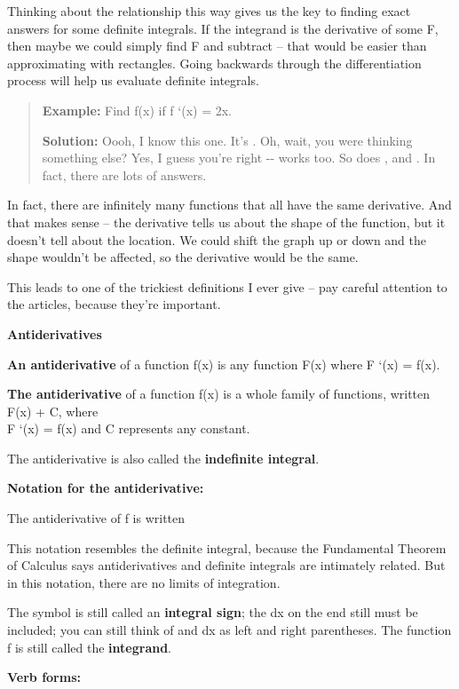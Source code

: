 Thinking about the relationship this way gives us the key to finding
exact answers for some definite integrals. If the integrand is the
derivative of some F, then maybe we could simply find F and subtract --
that would be easier than approximating with rectangles. Going backwards
through the differentiation process will help us evaluate definite
integrals.

\begin{quote}
\textbf{Example:} Find f(x) if f `(x) = 2x.

\textbf{Solution:} Oooh, I know this one. It's . Oh, wait, you were
thinking something else? Yes, I guess you're right -\/- works too. So
does , and . In fact, there are lots of answers.
\end{quote}

In fact, there are infinitely many functions that all have the same
derivative. And that makes sense -- the derivative tells us about the
shape of the function, but it doesn't tell about the location. We could
shift the graph up or down and the shape wouldn't be affected, so the
derivative would be the same.

This leads to one of the trickiest definitions I ever give -- pay
careful attention to the articles, because they're important.

\textbf{Antiderivatives}

\textbf{An antiderivative} of a function f(x) is any function F(x) where
F `(x) = f(x).

\textbf{The antiderivative} of a function f(x) is a whole family of
functions, written F(x) + C, where\\
F `(x) = f(x) and C represents any constant.

The antiderivative is also called the \textbf{indefinite integral}.

\textbf{Notation for the antiderivative: }

The antiderivative of f is written

This notation resembles the definite integral, because the Fundamental
Theorem of Calculus says antiderivatives and definite integrals are
intimately related. But in this notation, there are no limits of
integration.

The symbol is still called an \textbf{integral sign}; the dx on the end
still must be included; you can still think of and dx as left and right
parentheses. The function f is still called the \textbf{integrand}.

\textbf{Verb forms:}

